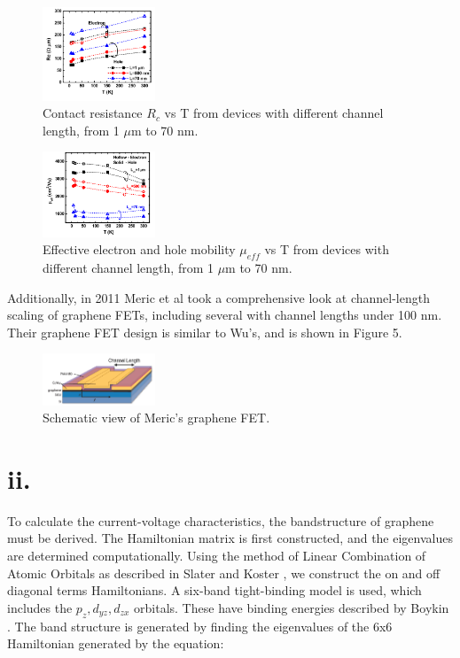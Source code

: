 \documentclass[11pt]{article}
\begin{document}
\begin{figure}[h!]
\centering 
\includegraphics[width=0.3\textwidth]{paper1_contactres.png}
\caption{Contact resistance $R_c$ vs T from devices with different channel length, from 1 $\mu$m to 70 nm.}\label{fig:FET}
\end{figure}

\begin{figure}[h!]
\centering 
\includegraphics[width=0.3\textwidth]{paper1_mobilitydata.png}
\caption{Effective electron and hole mobility $\mu_{eff}$ vs T from devices with different channel length, from 1 $\mu$m to 70 nm.}\label{fig:FET}
\end{figure}

Additionally, in 2011 Meric et al \cite{meric2011} took a comprehensive look at channel-length scaling of graphene FETs, including several with channel lengths under 100 nm. Their graphene FET design is similar to Wu's, and is shown in Figure 5.

\begin{figure}[h!]
\centering 
\includegraphics[width=0.3\textwidth]{meric_fet_layout.png}
\caption{Schematic view of Meric's graphene FET.}\label{fig:FET}
\end{figure}

\section*{ii.} To calculate the current-voltage characteristics, the bandstructure of graphene must be derived. The Hamiltonian matrix is first constructed, and the eigenvalues are determined computationally. Using the method of Linear Combination of Atomic Orbitals as described in Slater and Koster \cite{slaterkoster1954}, we construct the on and off diagonal terms Hamiltonians. A six-band tight-binding model is used, which includes the $p_z,d_{yz}, d_{zx}$ orbitals. These have binding energies described by Boykin \cite{boykin2011}. The band structure is generated by finding the eigenvalues of the 6x6 Hamiltonian generated by the equation:
\end{document}
